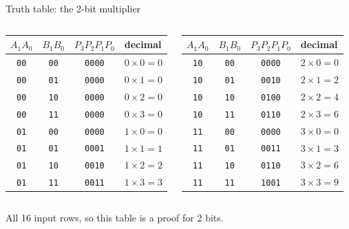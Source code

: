 \documentclass[aspectratio=169,10pt]{beamer}
\begin{document}
\begin{frame}{Truth table: the 2-bit multiplier}
\begin{columns}[t]
\begin{center}\small
\begin{tabular}{cc|c|l}
$A_1A_0$&$B_1B_0$&$P_3P_2P_1P_0$&decimal\\\hline
\texttt{00} & \texttt{00} & \texttt{0000} & $0\times0=0$\\
\texttt{00} & \texttt{01} & \texttt{0000} & $0\times1=0$\\
\texttt{00} & \texttt{10} & \texttt{0000} & $0\times2=0$\\
\texttt{00} & \texttt{11} & \texttt{0000} & $0\times3=0$\\
\texttt{01} & \texttt{00} & \texttt{0000} & $1\times0=0$\\
\texttt{01} & \texttt{01} & \texttt{0001} & $1\times1=1$\\
\texttt{01} & \texttt{10} & \texttt{0010} & $1\times2=2$\\
\texttt{01} & \texttt{11} & \texttt{0011} & $1\times3=3$\\
\end{tabular}
\end{center}
\begin{center}\small
\begin{tabular}{cc|c|l}
$A_1A_0$&$B_1B_0$&$P_3P_2P_1P_0$&decimal\\\hline
\texttt{10} & \texttt{00} & \texttt{0000} & $2\times0=0$\\
\texttt{10} & \texttt{01} & \texttt{0010} & $2\times1=2$\\
\texttt{10} & \texttt{10} & \texttt{0100} & $2\times2=4$\\
\texttt{10} & \texttt{11} & \texttt{0110} & $2\times3=6$\\
\texttt{11} & \texttt{00} & \texttt{0000} & $3\times0=0$\\
\texttt{11} & \texttt{01} & \texttt{0011} & $3\times1=3$\\
\texttt{11} & \texttt{10} & \texttt{0110} & $3\times2=6$\\
\texttt{11} & \texttt{11} & \texttt{1001} & $3\times3=9$\\
\end{tabular}
\end{center}
\end{columns}
All 16 input rows, so this table is a proof for 2 bits.
\end{frame}
\end{document}
